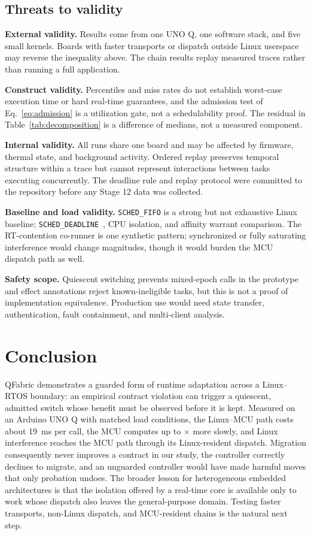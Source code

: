 \documentclass[conference]{IEEEtran}
\newcommand{\system}{QFabric\xspace}
\begin{document}
\subsection{Threats to validity}
\label{sec:threats}
\textbf{External validity.} Results come from one UNO Q, one software stack,
and five small kernels. Boards with faster transports or dispatch outside
Linux userspace may reverse the inequality above. The chain results replay
measured traces rather than running a full application.

\textbf{Construct validity.} Percentiles and miss rates do not establish
worst-case execution time or hard real-time guarantees, and the admission
test of Eq.~\eqref{eq:admission} is a utilization gate, not a schedulability
proof. The residual in Table~\ref{tab:decomposition} is a difference of
medians, not a measured component.

\textbf{Internal validity.} All runs share one board and may be affected by
firmware, thermal state, and background activity. Ordered replay preserves
temporal structure within a trace but cannot represent interactions between
tasks executing concurrently. The deadline rule and replay protocol were
committed to the repository before any Stage 12 data was collected.

\textbf{Baseline and load validity.} \texttt{SCHED\_FIFO} is a strong but not
exhaustive Linux baseline; \texttt{SCHED\_DEADLINE}~\cite{lelli2016deadline},
CPU isolation, and affinity warrant comparison. The RT-contention co-runner is
one synthetic pattern; synchronized or fully saturating interference would
change magnitudes, though it would burden the MCU dispatch path as well.

\textbf{Safety scope.} Quiescent switching prevents mixed-epoch calls in the
prototype and effect annotations reject known-ineligible tasks, but this is
not a proof of implementation equivalence. Production use would need state
transfer, authentication, fault containment, and multi-client analysis.

\section{Conclusion}
\label{sec:conclusion}
\system demonstrates a guarded form of runtime adaptation across a
Linux--RTOS boundary: an empirical contract violation can trigger a
quiescent, admitted switch whose benefit must be observed before it is kept.
Measured on an Arduino UNO Q with matched load conditions, the Linux--MCU
path costs about 19~ms per call, the MCU computes up to
\StageTwelveFirComputeRatio$\times$ more slowly, and Linux interference
reaches the MCU path through its Linux-resident dispatch. Migration
consequently never improves a contract in our study, the controller correctly
declines to migrate, and an unguarded controller would have made harmful
moves that only probation undoes. The broader lesson for heterogeneous
embedded architectures is that the isolation offered by a real-time core is
available only to work whose dispatch also leaves the general-purpose
domain. Testing faster transports, non-Linux dispatch, and MCU-resident
chains is the natural next step.
\end{document}
